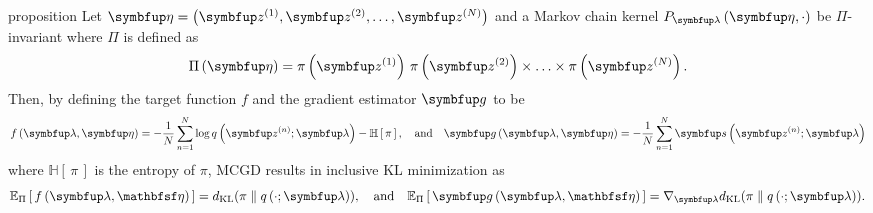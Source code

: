 
\begin{theoremEnd}{proposition}\label{thm:product_kernel}
  Let \(\veta = \left( \vz^{(1)}, \vz^{(2)}, \ldots, \vz^{(N)} \right)\) and a Markov chain kernel \(P_{\vlambda}\left(\veta, \cdot\right)\) be \(\Pi\)-invariant where \(\Pi\) is defined as
  {%
  \[
  \Pi\left(\veta\right) = \pi\left(\vz^{(1)}\right) \, \pi\left(\vz^{(2)}\right) \times \ldots \times \pi\left(\vz^{(N)}\right).
  \]
  }
  Then, by defining the target function \(f\) and the gradient estimator \(\vg\) to be 
  {\small
  \begin{align*}
    f\left(\vlambda, \veta\right) =  -\frac{1}{N} \sum^{N}_{n=1} \log q\left(\vz^{(n)}; \vlambda\right) - \mathbb{H}\left[\,\pi\,\right], 
    \quad\text{and}\quad
    \vg\left(\vlambda, \veta\right) =  -\frac{1}{N} \sum^{N}_{n=1} \vs\left(\vz^{(n)}; \vlambda\right)
  \end{align*}
  }
  where \(\mathbb{H}\left[\,\pi\,\right]\) is the entropy of \(\pi\), MCGD results in inclusive KL minimization as
  {%
  \begin{align*}
    \Esub{\Pi}{ f\left(\vlambda, \rvveta\right) } = \DKL{\pi}{q\left(\cdot; \vlambda\right)},
    \quad\text{and}\quad
    \Esub{\Pi}{ \vg\left(\vlambda, \rvveta\right) } = \nabla_{\vlambda} \DKL{\pi}{q\left(\cdot; \vlambda\right)}.
  \end{align*}
  }
\end{theoremEnd}
